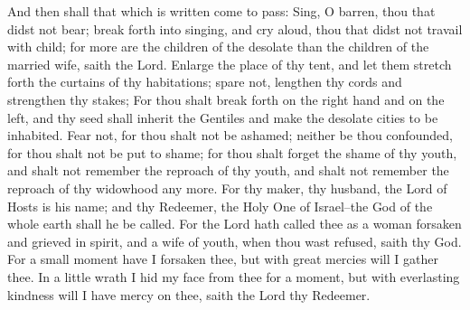 And then shall that which is written come to pass: Sing, O barren, thou that didst not bear; break forth into singing, and cry aloud, thou that didst not travail with child; for more are the children of the desolate than the children of the married wife, saith the Lord.
\bverse \iffalse Enlarge the place of thy tent, and let them stretch forth the curtains of thy habitations; spare not, lengthen thy cords and strengthen thy stakes; \fi
Enlarge the place of thy tent, and let them stretch forth the curtains of thy habitations; spare not, lengthen thy cords and strengthen thy stakes;
\bverse \iffalse For thou shalt break forth on the right hand and on the left, and thy seed shall inherit the Gentiles and make the desolate cities to be inhabited. \fi
For thou shalt break forth on the right hand and on the left, and thy seed shall inherit the Gentiles and make the desolate cities to be inhabited.
\bverse \iffalse Fear not, for thou shalt not be ashamed; neither be thou confounded, for thou shalt not be put to shame; for thou shalt forget the shame of thy youth, and shalt not remember the reproach of thy youth, and shalt not remember the reproach of thy widowhood any more. \fi
Fear not, for thou shalt not be ashamed; neither be thou confounded, for thou shalt not be put to shame; for thou shalt forget the shame of thy youth, and shalt not remember the reproach of thy youth, and shalt not remember the reproach of thy widowhood any more.
\bverse \iffalse For thy maker, thy husband, the Lord of Hosts is his name; and thy Redeemer, the Holy One of Israel--the God of the whole earth shall he be called. \fi
For thy maker, thy husband, the Lord of Hosts is his name; and thy Redeemer, the Holy One of Israel--the God of the whole earth shall he be called.
\bverse \iffalse For the Lord hath called thee as a woman forsaken and grieved in spirit, and a wife of youth, when thou wast refused, saith thy God. \fi
For the Lord hath called thee as a woman forsaken and grieved in spirit, and a wife of youth, when thou wast refused, saith thy God.
\bverse \iffalse For a small moment have I forsaken thee, but with great mercies will I gather thee. \fi
For a small moment have I forsaken thee, but with great mercies will I gather thee.
\bverse \iffalse In a little wrath I hid my face from thee for a moment, but with everlasting kindness will I have mercy on thee, saith the Lord thy Redeemer. \fi
In a little wrath I hid my face from thee for a moment, but with everlasting kindness will I have mercy on thee, saith the Lord thy Redeemer.
